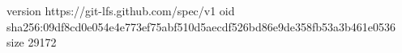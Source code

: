 version https://git-lfs.github.com/spec/v1
oid sha256:09df8cd0e054e4e773ef75abf510d5aecdf526bd86e9de358fb53a3b461e0536
size 29172
